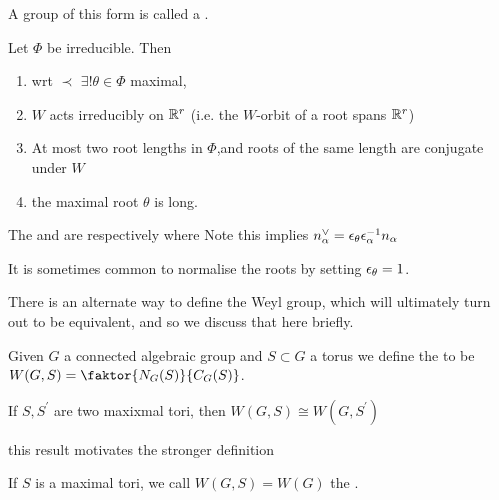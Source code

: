 \documentclass{article}
\begin{document}
\begin{remark}
	A group of this form is called a .
\end{remark}

\begin{prop}
	Let $\Phi$ be irreducible. Then
	\begin{enumerate}
		\item wrt $\prec$ $\exists! \theta \in \Phi$ maximal,
		\item $W$ acts irreducibly on $\mathbb{R}^r$ (i.e. the $W$-orbit of a root spans $\mathbb{R}^r$)
		\item At most two root lengths in $\Phi$,and roots of the same length are conjugate under $W$
		\item the maximal root $\theta$ is long. 
	\end{enumerate}
\end{prop}

\begin{definition}
	The  and  are respectively 
where 
Note this implies $n_\alpha^\vee = \epsilon_\theta \epsilon_\alpha^{-1} n_\alpha$
\end{definition}

\begin{remark}
	It is sometimes common to normalise the roots by setting $\epsilon_\theta = 1$. 
\end{remark}

There is an alternate way to define the Weyl group, which will ultimately turn out to be equivalent, and so we discuss that here briefly. 

\begin{definition}
	Given $G$ a  connected algebraic group and $S \subset G$ a torus we define the  to be $W(G,S) = \faktor{N_G(S)}{C_G(S)}$. 
\end{definition}

\begin{lemma}
	If $S,S^\prime$ are two maxixmal tori, then $W(G,S)\cong W(G,S^\prime)$ 
\end{lemma}

this result motivates the stronger definition

\begin{definition}
	If $S$ is a maximal tori, we call $W(G,S)=W(G)$ the . 
\end{definition}
\end{document}
